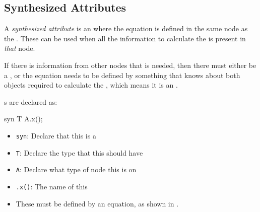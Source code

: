 \subsection{Synthesized Attributes}\label{subsec:Synthesized_Attributes}
\begin{definition}\label{def:Synthesized_Attribute}
  A \emph{synthesized attribute} is an  where the equation is defined in the same node as the .
  These can be used when all the information to calculate the  is present in \emph{that} node.

  If there is information from other nodes that is needed, then there must either be a , or the equation needs to be defined by something that knows about both objects required to calculate the , which means it is an .

  s are declared as:
\begin{javasource}
  syn T A.x();
\end{javasource}
  \begin{itemize}[noitemsep]
  \item \texttt{syn}: Declare that this  is a 
  \item \texttt{T}: Declare the type that this  should have
  \item \texttt{A}: Declare what type of  node this  is on
  \item \texttt{.x()}: The name of this 
  \item These must be defined by an equation, as shown in .
  \end{itemize}


\end{definition}
